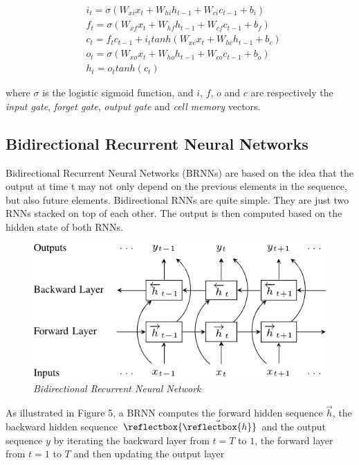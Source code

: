 \documentclass[conference]{IEEEtran}
\newcommand{\cev}[1]{\reflectbox{\ensuremath{\vec{\reflectbox{\ensuremath{#1}}}}}}
\begin{document}
\begin{align*}
     &i_t = \sigma (W_{xi}x_t + W_{hi}h_{t-1} + W_{ci}c_{t-1} + b_i) \\
     &f_t = \sigma (W_{xf}x_t + W_{hf}h_{t-1} + W_{cf}c_{t-1} + b_f) \\
     &c_t = f_tc_{t-1} + i_t tanh(W_{xc}x_t + W_{hc}h_{t-1} + b_c) \\
     &o_t = \sigma (W_{xo}x_t + W_{ho}h_{t-1} + W_{co}c_{t-1} + b_o) \\
     &h_t = o_t tanh(c_t)
\end{align*} 

where $\sigma$ is the logistic sigmoid function, and $i$, $f$, $o$ and $c$ are respectively the \textit{input gate}, \textit{forget gate}, \textit{output gate} and \textit{cell memory} vectors.

\subsection{Bidirectional Recurrent Neural Networks}
Bidirectional Recurrent Neural Networks (BRNNs) are based on the idea that the output at time t may not only depend on the previous elements in the sequence, but also future elements. Bidirectional RNNs are quite simple. They are just two RNNs stacked on top of each other. The output is then computed based on the hidden state of both RNNs.



\begin{figure}[h]
\includegraphics[scale=0.4]{brnn.png}
\centering
\caption{\textit{Bidirectional Recurrent Neural Network}}
\end{figure}

As illustrated in Figure 5, a BRNN computes the forward hidden sequence $\vec{h}$, the backward hidden sequence $\cev{h}$ and the output sequence $y$ by iterating the backward layer from $t = T$ to $1$, the forward layer from $t = 1$ to $T$ and then updating the output layer
\end{document}
